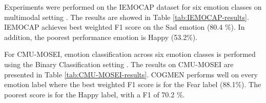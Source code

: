 %
Experiments were performed on the IEMOCAP dataset for six emotion classes on multimodal setting \cite{HP_Advanced}. The results are showed in Table \ref{tab:IEMOCAP-results}. IEMOCAP achieves best weighted F1 score on the Sad emotion (80.4 \%). In addition, the poorest performance emotion is Happy (53.2\%).
%
\begin{table}[h]
    \caption{Results on the IEMOCAP dataset (6-way). Avg. denotes the weighted average.}
    \centering
    \label{tab:IEMOCAP-results}
\end{table}
%
For CMU-MOSEI, emotion classification across six emotion classes is performed using the Binary Classification setting \cite{COGMEN_joshi-etal-2022-cogmen}. The results on CMU-MOSEI are presented in Table \ref{tab:CMU-MOSEI-results}. COGMEN performs well on every emotion label where the best weighted F1 score is for the Fear label (88.1\%). The poorest score is for the Happy label, with a F1 of 70.2 \%. 
%
\begin{table}[h]
    \caption{Results on the CMU-MOSEI dataset (6-emotion class). Avg. denotes the weighted average.}
    \centering
    \label{tab:CMU-MOSEI-results}
\end{table}
